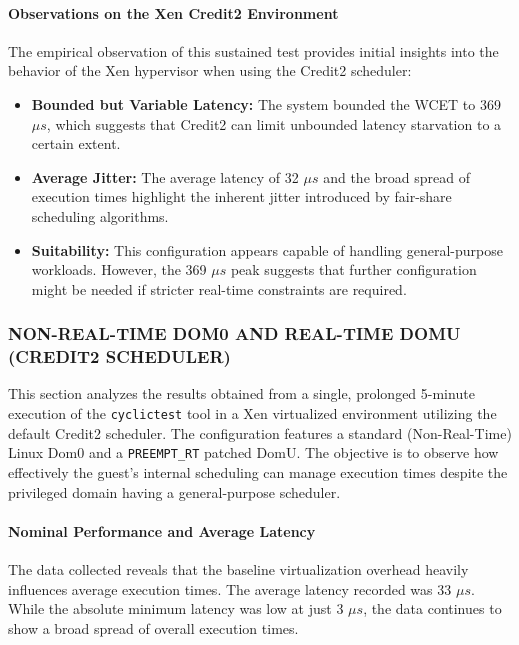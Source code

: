 \paragraph{Observations on the Xen Credit2
Environment}\label{observations-on-the-xen-credit2-environment}

The empirical observation of this sustained test provides initial
insights into the behavior of the Xen hypervisor when using the Credit2
scheduler:

\begin{itemize}
\item
  \textbf{Bounded but Variable Latency:} The system bounded the WCET to
  369 $\mu s$, which suggests that Credit2 can limit unbounded latency
  starvation to a certain extent.
\item
  \textbf{Average Jitter:} The average latency of 32 $\mu s$ and the broad
  spread of execution times highlight the inherent jitter introduced by
  fair-share scheduling algorithms.
\item
  \textbf{Suitability:} This configuration appears capable of handling
  general-purpose workloads. However, the 369 $\mu s$ peak suggests that
  further configuration might be needed if stricter real-time
  constraints are required.
\end{itemize}

\subsubsection{NON-REAL-TIME DOM0 AND REAL-TIME DOMU (CREDIT2
SCHEDULER)}\label{non-real-time-dom0-and-real-time-domu-credit2-scheduler}

This section analyzes the results obtained from a single, prolonged
5-minute execution of the \texttt{cyclictest} tool in a Xen virtualized
environment utilizing the default Credit2 scheduler. The configuration
features a standard (Non-Real-Time) Linux Dom0 and a
\texttt{PREEMPT\_RT} patched DomU. The objective is to observe how
effectively the guest's internal scheduling can manage execution times
despite the privileged domain having a general-purpose scheduler.

\paragraph{Nominal Performance and Average
Latency}\label{nominal-performance-and-average-latency-8}

The data collected reveals that the baseline virtualization overhead
heavily influences average execution times. The average latency recorded
was 33 $\mu s$. While the absolute minimum latency was low at just 3 $\mu s$, the
data continues to show a broad spread of overall execution times.

